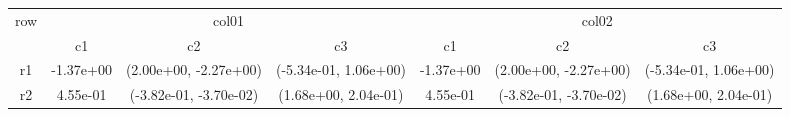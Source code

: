 \begin{tabular}{ccccccc}
\toprule
\multirow{2}{*}{row}&\multicolumn{3}{c}{col01}&\multicolumn{3}{c}{col02}\tabularnewline
\cmidrule(lr){2-4}
\cmidrule(lr){5-7}
&c1&c2&c3&c1&c2&c3\tabularnewline
\midrule
r1&-1.37e+00& (2.00e+00, -2.27e+00)& (-5.34e-01, 1.06e+00)&-1.37e+00& (2.00e+00, -2.27e+00)& (-5.34e-01, 1.06e+00)\tabularnewline
r2&4.55e-01& (-3.82e-01, -3.70e-02)& (1.68e+00, 2.04e-01)&4.55e-01& (-3.82e-01, -3.70e-02)& (1.68e+00, 2.04e-01)\tabularnewline
\bottomrule
\end{tabular}
